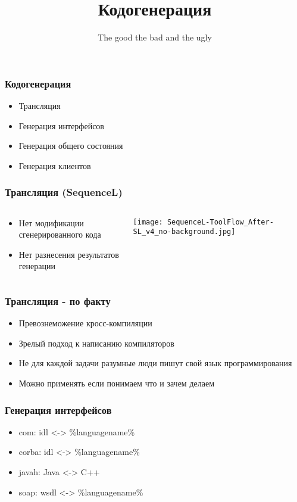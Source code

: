 \documentclass[mathserif,serif]{beamer}
\title[Кодогенерация]
{Кодогенерация}
\subtitle{The good the bad and the ugly}
\date
{}
\begin{document}
\frame{\titlepage}

\begin{frame}
	\frametitle{Кодогенерация}
	\begin{itemize}
		\item{Трансляция}
		\item{Генерация интерфейсов}
		\item{Генерация общего состояния}
		\item{Генерация клиентов}
	\end{itemize}
\end{frame}

\begin{frame}
	\frametitle{Трансляция (SequenceL)}
	\begin{columns}[T]
		\begin{column}{.5\linewidth}
			\begin{minipage}[c][\textheight][c]{\linewidth}
				\begin{itemize}
					\item{Нет модификации сгенерированного кода}
					\item{Нет разнесения результатов генерации}
				\end{itemize}
			\end{minipage}
		\end{column}
		\begin{column}{.5\linewidth}
			\texttt{[image: SequenceL-ToolFlow\_After-SL\_v4\_no-background.jpg]}
		\end{column}
	\end{columns}
\end{frame}

\begin{frame}
	\frametitle{Трансляция - по факту}
	\begin{itemize}
		\item{Превознеможение кросс-компиляции}
		\item{Зрелый подход к написанию компиляторов}
		\item{Не для каждой задачи разумные люди пишут свой язык программирования}
		\item{Можно применять если понимаем что и зачем делаем}
	\end{itemize}
\end{frame}

\begin{frame}
	\frametitle{Генерация интерфейсов}
	\begin{itemize}
		\item{com: idl <-> \%languagename\%}
		\item{corba: idl <-> \%languagename\%}
		\item{javah: Java <-> C++}
		\item{soap: wsdl <-> \%languagename\%}
	\end{itemize}
\end{frame}
\end{document}
